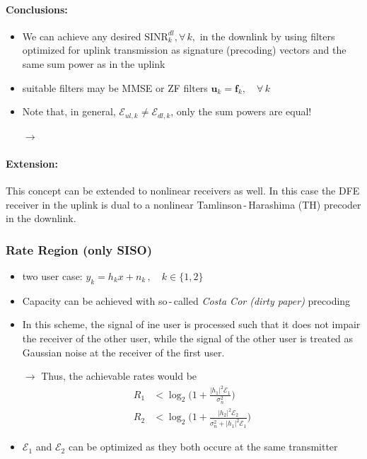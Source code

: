 \documentclass[a4paper, 10pt]{article}
\begin{document}
\paragraph{Conclusions:}
\begin{itemize}
	\item We can achieve any desired $\text{SINR}_k^{dl},\forall\, k,$ in the downlink by using filters optimized for uplink transmission as signature (precoding) vectors and the same sum power as in the uplink
	\item suitable filters may be MMSE or ZF filters $ \mathbf{u}_k = \mathbf{f}_k, \quad \forall \, k $
	\item Note that, in general, $\mathcal{E}_{ul,k} \neq \mathcal{E}_{dl,k} $, only the sum powers are equal!
	\item[$\rightarrow$] 
\end{itemize}
\paragraph{Extension:} This concept can be extended to nonlinear receivers as well. In this case the DFE receiver in the uplink is dual to a nonlinear Tamlinson\,-\,Harashima (TH) precoder in the downlink.

\subsubsection{Rate Region (only SISO)}
\begin{itemize}
	\item two user case: $ y_k = h_kx + n_k\,,\quad k \in \{1,2\} $
	\item Capacity can be achieved with so\,-\,called \textit{Costa Cor (dirty paper)} precoding
	\item In this scheme, the signal of ine user is processed such that it does not impair the receiver of the other user, while the signal of the other user is treated as Gaussian noise at the receiver of the first user.
	\item[$\rightarrow$] Thus, the achievable rates would be
	\begin{align*}
		R_1 &< \log_2\bigl(1 + \frac{|h_1|^2\mathcal{E}_1}{\sigma_n^2}\bigr)\\
		R_2 &< \log_2\bigl(1 + \frac{|h_2|^2\mathcal{E}_2}{\sigma_n^2 + |h_1|^2\mathcal{E}_1}\bigr)			
	\end{align*}	 
	\item $\mathcal{E}_1 $ and $\mathcal{E}_2 $ can be optimized as they both occure at the same transmitter
\end{itemize}
\newpage
\end{document}
